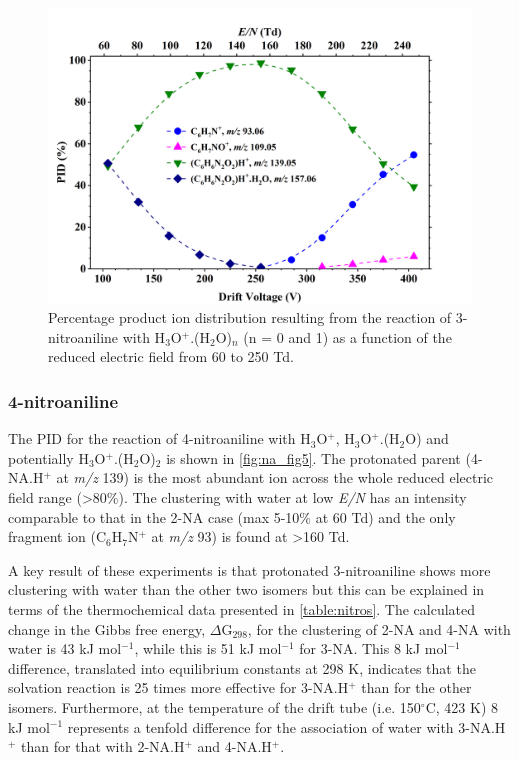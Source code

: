 \begin{figure}%
\centering
\includegraphics[height=0.35\textheight]{pics/nitros_paper_4.png}
\caption{Percentage product ion distribution resulting from the reaction of 3-nitroaniline with H$_3$O$^+$.(H$_2$O)$_n$ (n = 0 and 1) as a function of the reduced electric field from 60 to 250 Td.}
\label{fig:na_fig4}
\end{figure}

\subsubsection{4-nitroaniline}
The PID for the reaction of 4-nitroaniline with H$_3$O$^+$, H$_3$O$^+$.(H$_2$O) and potentially H$_3$O$^+$.(H$_2$O)$_2$ is shown in \autoref{fig:na_fig5}. 
The protonated parent (4-NA.H$^+$ at \textit{m/z} 139) is the most abundant ion across the whole reduced electric field range (>80\%).
The clustering with water at low \textit{E/N} has an intensity comparable to that in the 2-NA case (max 5-10\% at 60 Td) and the only fragment ion (C$_6$H$_7$N$^+$ at \textit{m/z} 93) is found at >160 Td.

A key result of these experiments is that protonated 3-nitroaniline shows more clustering with water than the other two isomers but this can be explained in terms of the thermochemical data presented in \autoref{table:nitros}.
The calculated change in the Gibbs free energy, $\Delta$G$_{298}$, for the clustering of 2-NA and 4-NA with water is 43 kJ mol$^{-1}$, while this is 51 kJ mol$^{-1}$ for 3-NA. 
This 8 kJ mol$^{-1}$ difference, translated into equilibrium constants  at 298 K, %
indicates that the solvation reaction is 25 times more effective for 3-NA.H$^+$ than for the other isomers. 
Furthermore, at the temperature of the drift tube (i.e. 150$^\circ$C, 423 K) 8 kJ mol$^{-1}$ represents a tenfold difference for the association of water with  3-NA.H$^+$ than for that with 2-NA.H$^+$ and 4-NA.H$^+$.


